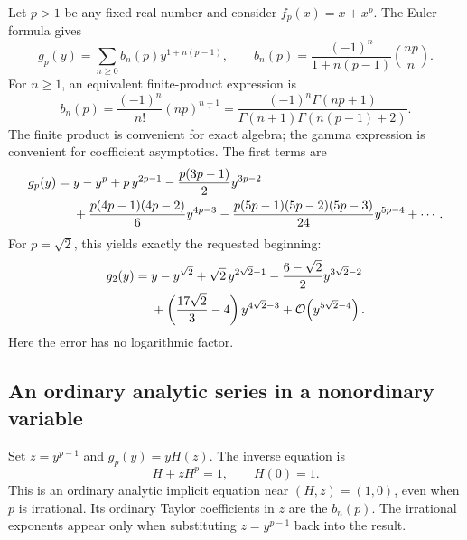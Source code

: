 \documentclass[11pt,a4paper]{article}
\numberwithin{equation}{section}
\theoremstyle{definition}\newtheorem{definition}[theorem]{Definition}
\theoremstyle{remark}\newtheorem{remark}[theorem]{Remark}
\newcommand{\bigO}{\mathcal O}
\newcommand{\fall}[2]{(#1)^{\underline{#2}}}
\begin{document}
Let \(p>1\) be any fixed real number and consider \(f_p(x)=x+x^p\).
The Euler formula gives
\begin{equation}\label{eq:fuss}
 g_p(y)=\sum_{n\ge0}b_n(p)y^{1+n(p-1)},
 \qquad
 b_n(p)=\frac{(-1)^n}{1+n(p-1)}\binom{np}{n}.
\end{equation}
For \(n\ge1\), an equivalent finite-product expression is
\begin{equation}\label{eq:fuss-product}
 b_n(p)=\frac{(-1)^n}{n!}\fall{np}{n-1}
       =\frac{(-1)^n\Gamma(np+1)}
       {\Gamma(n+1)\Gamma(n(p-1)+2)}.
\end{equation}
The finite product is convenient for exact algebra; the gamma expression is
convenient for coefficient asymptotics. The first terms are
\begin{align}\label{eq:p-general}
 g_p(y)={}&y-y^p+p\,y^{2p-1}
 -\frac{p(3p-1)}2y^{3p-2}\notag\\
 &+\frac{p(4p-1)(4p-2)}6y^{4p-3}
 -\frac{p(5p-1)(5p-2)(5p-3)}{24}y^{5p-4}+\cdots.
\end{align}
For \(p=\sqrt2\), this yields exactly the requested beginning:
\begin{align}\label{eq:sqrt2-answer}
 g_2(y)={}&y-y^{\sqrt2}+\sqrt2\,y^{2\sqrt2-1}
 -\frac{6-\sqrt2}{2}y^{3\sqrt2-2}\notag\\
 &+\left(\frac{17\sqrt2}{3}-4\right)y^{4\sqrt2-3}
 +\bigO\!\left(y^{5\sqrt2-4}\right).
\end{align}
Here the error has no logarithmic factor.

\subsection{An ordinary analytic series in a nonordinary variable}
Set \(z=y^{p-1}\) and \(g_p(y)=y H(z)\). The inverse equation is
\begin{equation}\label{eq:fuss-implicit}
 H+zH^p=1,\qquad H(0)=1.
\end{equation}
This is an ordinary analytic implicit equation near \((H,z)=(1,0)\), even
when \(p\) is irrational. Its ordinary Taylor coefficients in \(z\) are the
\(b_n(p)\). The irrational exponents appear only when substituting
\(z=y^{p-1}\) back into the result.
\end{document}
